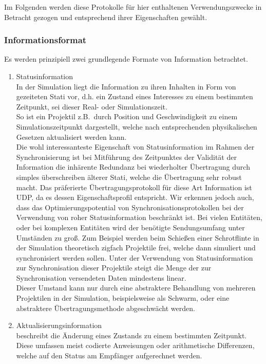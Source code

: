 \documentclass[11pt,twoside,a4paper]{article}
\begin{document}
Im Folgenden werden diese Protokolle für hier enthaltenen Verwendungszwecke in Betracht gezogen und entsprechend ihrer Eigenschaften gewählt.

\subsubsection{Informationsformat}

Es werden prinzipiell zwei grundlegende Formate von Information betrachtet.
\begin{enumerate}
\item Statusinformation\\
In der Simulation liegt die Information zu ihren Inhalten in Form von gezeiteten Stati vor, d.h. ein Zustand eines Interesses zu einem bestimmten Zeitpunkt, sei dieser Real- oder Simulationszeit. \\
So ist ein Projektil z.B.~durch Position und Geschwindigkeit zu einem Simulationszeitpunkt dargestellt, welche nach entsprechenden physikalischen Gesetzen aktualisiert werden kann.\\
Die wohl interessanteste Eigenschaft von Statusinformation im Rahmen der Synchronisierung ist bei Mitführung des Zeitpunktes der Validität der Information die inhärente Redundanz bei wiederholter Übertragung durch simples überschreiben älterer Stati, welche die Übertragung sehr robust macht.
Das präferierte Übertragungsprotokoll für diese Art Information ist UDP, da es dessen Eigenschaftsprofil entspricht.
Wir erkennen jedoch auch, dass das Optimierungspotential von Synchronisationsprotokollen bei der Verwendung von roher Statusinformation beschränkt ist. Bei vielen Entitäten, oder bei komplexen Entitäten wird der benötigte Sendungsumfang unter Umständen zu groß.
Zum Beispiel werden beim Schießen einer Schrotflinte in der Simulation theoretisch zigfach Projektile frei, welche dann simuliert und synchronisiert werden sollen.
Unter der Verwendung von Statusinformation zur Synchronisation dieser Projektile steigt die Menge der zur Synchronisation versendeten Daten mindestens linear.\\
Dieser Umstand kann nur durch eine abstraktere Behandlung von mehreren Projektilen in der Simulation, beispielsweise als Schwarm, oder eine abstraktere Übertragungsmethode abgeschwächt werden.
\item Aktualisierungsinformation\\
beschreibt die Änderung eines Zustands zu einem bestimmten Zeitpunkt. Diese umfassen meist codierte Anweisungen oder arithmetische Differenzen, welche auf den Status am Empfänger aufgerechnet werden.\\

\end{enumerate}
\end{document}
